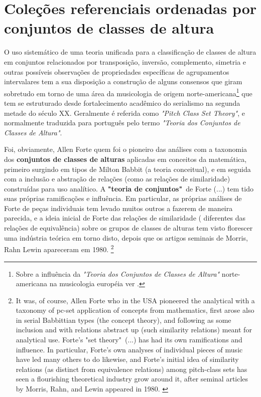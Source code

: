\documentclass[
	12pt,				%
	openright,			%
	twoside,			%
	a4paper,			%
	english,			%
	french,				%
	spanish,			%
	brazil				%
	]{abntex2}
\begin{document}
\section{Coleções referenciais ordenadas por conjuntos de classes de altura}

O uso sistemático de uma teoria unificada para a classificação de classes de altura em conjuntos relacionados por transposição, inversão, complemento, simetria e outras possíveis observações de propriedades específicas de agrupamentos intervalares tem a sua disposição a construção de alguns consensos que giram sobretudo em torno de uma área da musicologia de origem norte-americana\footnote{Sobre a influência da \textit{"Teoria dos Conjuntos de Classes de Altura"} norte-americana na musicologia européia ver .} que tem se estruturado desde fortalecimento acadêmico do serialismo na segunda metade do século XX. Geralmente é referida como \textit{"Pitch Class Set Theory"}, e normalmente traduzida para português pelo termo \textit{"Teoria dos Conjuntos de Classes de Altura"}\cite{straus2004}.

\begin{citacao}
Foi, obviamente, Allen Forte quem foi o pioneiro das análises com a taxonomia dos \textbf{conjuntos de classes de alturas} aplicadas em conceitos da matemática, primeiro surgindo em tipos de Milton Babbit (a teoria conceitual), e em seguida com a inclusão e abstração de relações (como as relações de similaridade) construídas para uso analítico. A \textbf{"teoria de conjuntos"}\ de Forte (...) tem tido suas próprias ramificações e influência. Em particular, as próprias análises de Forte de peças individuais tem levado muitos outros a fazerem de maneira parecida, e a ideia inicial de Forte das relações de similaridade ( diferentes das relações de equivalência) sobre os grupos de classes de alturas tem visto florescer uma indústria teórica em torno disto, depois que os artigos seminais de Morris, Rahn  Lewin apareceram em 1980. \cite[ p. 130]{rahn2004swerve}\footnote{
It was, of course, Allen Forte who in the USA pioneered the analytical with a taxonomy of pc-set application of concepts from mathematics, first arose also in serial Babbittian types (the concept theory), and following as some inclusion and with relations abstract up (such similarity relations) meant for analytical use. Forte's "set theory"\  (...) has had its own ramifications and influence. In particular, Forte's own analyses of individual pieces of music have led many others to do likewise, and Forte's initial idea of similarity relations (as distinct from equivalence relations) among pitch-class sets has seen a flourishing theoretical industry grow around it, after seminal articles by Morris, Rahn, and Lewin appeared in 1980. \cite[ p. 130, grifo nossos]{rahn2004swerve}}
\end{citacao}
\end{document}
